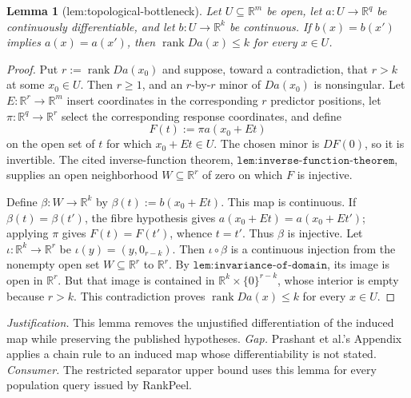\documentclass{article}
\newtheorem{lemma}{Lemma}
\begin{document}
\begin{lemma}[lem:topological-bottleneck]\label{lem:topological-bottleneck}
Let \(U\subseteq\mathbb R^m\) be open, let \(a:U\to\mathbb R^q\) be continuously differentiable, and let \(b:U\to\mathbb R^k\) be continuous. If \(b(x)=b(x')\) implies \(a(x)=a(x')\), then \(\operatorname{rank}Da(x)\le k\) for every \(x\in U\).
\end{lemma}
\begin{proof}
Put \(r:=\operatorname{rank}Da(x_0)\) and suppose, toward a contradiction, that \(r>k\) at some \(x_0\in U\).  Then \(r\geq1\), and an \(r\)-by-\(r\) minor of \(Da(x_0)\) is nonsingular.  Let \(E:\mathbb R^r\to\mathbb R^m\) insert coordinates in the corresponding \(r\) predictor positions, let \(\pi:\mathbb R^q\to\mathbb R^r\) select the corresponding response coordinates, and define
\[
 F(t):=\pi a(x_0+Et)
\]
on the open set of \(t\) for which \(x_0+Et\in U\).  The chosen minor is \(DF(0)\), so it is invertible.  The cited inverse-function theorem, \(\texttt{lem:inverse-function-theorem}\), supplies an open neighborhood \(W\subseteq\mathbb R^r\) of zero on which \(F\) is injective.

Define \(\beta:W\to\mathbb R^k\) by \(\beta(t):=b(x_0+Et)\).  This map is continuous.  If \(\beta(t)=\beta(t')\), the fibre hypothesis gives \(a(x_0+Et)=a(x_0+Et')\); applying \(\pi\) gives \(F(t)=F(t')\), whence \(t=t'\).  Thus \(\beta\) is injective.  Let \(\iota:\mathbb R^k\to\mathbb R^r\) be \(\iota(y)=(y,0_{r-k})\).  Then \(\iota\circ\beta\) is a continuous injection from the nonempty open set \(W\subseteq\mathbb R^r\) to \(\mathbb R^r\).  By \(\texttt{lem:invariance-of-domain}\), its image is open in \(\mathbb R^r\).  But that image is contained in \(\mathbb R^k\times\{0\}^{r-k}\), whose interior is empty because \(r>k\).  This contradiction proves \(\operatorname{rank}Da(x)\leq k\) for every \(x\in U\).
\end{proof}
\par\smallskip\noindent \textit{Justification.} This lemma removes the unjustified differentiation of the induced map while preserving the published hypotheses. \textit{Gap.} Prashant et al.'s Appendix applies a chain rule to an induced map whose differentiability is not stated. \textit{Consumer.} The restricted separator upper bound uses this lemma for every population query issued by RankPeel.
\end{document}
